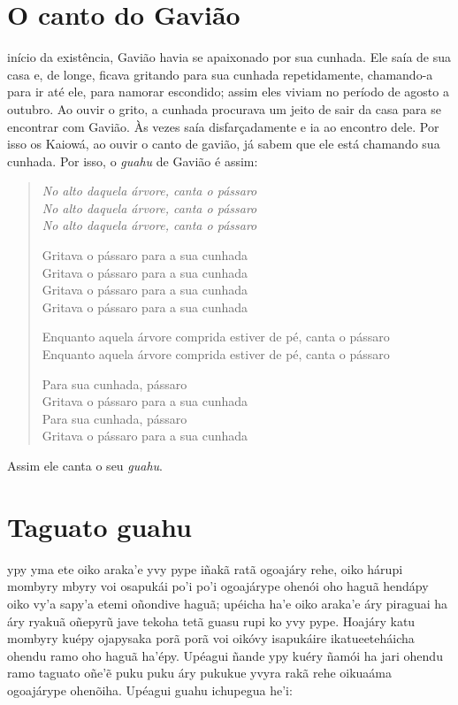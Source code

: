 \chapter{O canto do Gavião}

 início da existência, Gavião havia se apaixonado por sua cunhada. Ele
saía de sua casa e, de longe, ficava gritando para sua cunhada
repetidamente, chamando-a para ir até ele, para namorar escondido; assim
eles viviam no período de agosto a outubro. Ao ouvir o grito, a cunhada
procurava um jeito de sair da casa para se encontrar com Gavião. Às
vezes saía disfarçadamente e ia ao encontro dele. Por isso os Kaiowá, ao
ouvir o canto de gavião, já sabem que ele está chamando sua cunhada. Por
isso, o \emph{guahu} de Gavião é assim:

\begin{verse}
\itshape
No alto daquela árvore, canta o pássaro\\
No alto daquela árvore, canta o pássaro\\
No alto daquela árvore, canta o pássaro

Gritava o pássaro para a sua cunhada\\
Gritava o pássaro para a sua cunhada\\
Gritava o pássaro para a sua cunhada\\
Gritava o pássaro para a sua cunhada

Enquanto aquela árvore comprida estiver de pé, \qb{}canta o pássaro\\
Enquanto aquela árvore comprida estiver de pé, \qb{}canta o pássaro

Para sua cunhada, pássaro\\ \EP[1]
Gritava o pássaro para a sua cunhada\\
Para sua cunhada, pássaro\\
Gritava o pássaro para a sua cunhada
\end{verse}

Assim ele canta o seu \emph{guahu}.

\chapter{Taguato guahu}

 ypy yma ete oiko araka'e yvy pype iñakã ratã ogoajáry rehe, oiko
hárupi mombyry mbyry voi osapukái po'i po'i ogoajárype ohenói oho haguã
hendápy oiko vy'a sapy'a etemi oñondive haguã; upéicha ha'e oiko araka'e
áry piraguai ha áry ryakuã oñepyrũ jave tekoha tetã guasu rupi ko yvy
pype. Hoajáry katu mombyry kuépy ojapysaka porã porã voi oikóvy
isapukáire ikatueeteháicha ohendu ramo oho haguã ha'épy. Upéagui ñande
ypy kuéry ñamói ha jari ohendu ramo taguato oñe'ẽ puku puku áry pukukue
yvyra rakã rehe oikuaáma ogoajárype ohenõiha. Upéagui guahu ichupegua
he'i:

